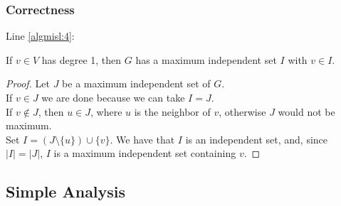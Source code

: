 \begin{frame}
	\frametitle{Correctness}
	
	Line \ref{algmisl:4}:
	\begin{lemma}
		If $v\in V$ has degree 1, then $G$ has a maximum independent set $I$ with $v\in I$.
	\end{lemma}
	\begin{proof}
		Let $J$ be a maximum independent set of $G$.\\
		If $v\in J$ we are done because we can take $I=J$.\\
		If $v\notin J$, then $u\in J$, where $u$ is the neighbor of $v$, otherwise $J$ would not be maximum.\\
		Set $I=(J\setminus \{u\})\cup \{v\}$. We have that $I$ is an independent set, and, since $|I|=|J|$, $I$ is a maximum independent set containing $v$.
	\end{proof}
	
\end{frame}

\subsection{Simple Analysis}

